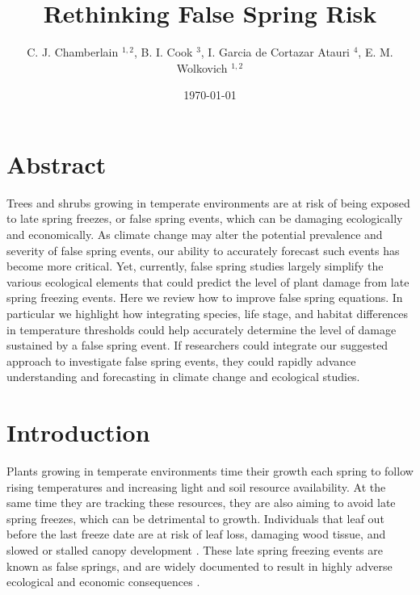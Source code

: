 \documentclass{article}\usepackage[]{graphicx}\usepackage[]{color}
\begin{document}
\title{Rethinking False Spring Risk}
\author{C. J. Chamberlain $^{1,2}$, B. I. Cook $^{3}$, I. Garcia de Cortazar Atauri $^{4}$, E. M. Wolkovich $^{1,2}$}
\date{\today}
\maketitle 
 

\renewcommand{\thetable}{\arabic{table}}
\renewcommand{\thefigure}{\arabic{figure}}
\renewcommand{\labelitemi}{$-$}



\section{Abstract}
Trees and shrubs growing in temperate environments are at risk of being exposed to late spring freezes, or false spring events, which can be damaging ecologically and economically. As climate change may alter the potential prevalence and severity of false spring events, our ability to accurately forecast such events has become more critical. Yet, currently, false spring studies largely simplify the various ecological elements that could predict the level of plant damage from late spring freezing events. Here we review how to improve false spring equations. In particular we highlight how integrating species, life stage, and habitat differences in temperature thresholds could help accurately determine the level of damage sustained by a false spring event. If researchers could integrate our suggested approach to investigate false spring events, they could rapidly advance understanding and forecasting in climate change and ecological studies.

\section{Introduction}

Plants growing in temperate environments time their growth each spring to follow rising temperatures and increasing light and soil resource availability. At the same time they are tracking these resources, they are also aiming to avoid late spring freezes, which can be detrimental to growth. Individuals that leaf out before the last freeze date are at risk of leaf loss, damaging wood tissue, and slowed or stalled canopy development \citep{Gu2008, Hufkens2012}. These late spring freezing events are known as false springs, and are widely documented to result in highly adverse ecological and economic consequences \citep{Knudson2012, Ault2013}.
\end{document}
